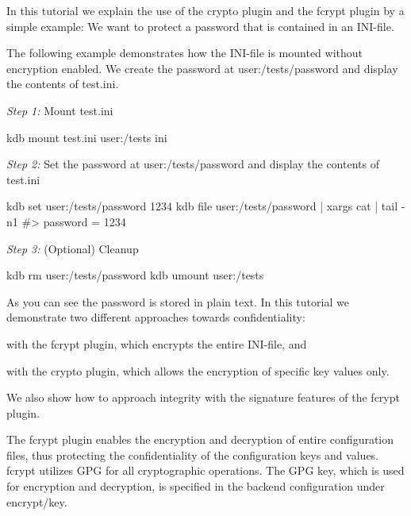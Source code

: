 In this tutorial we explain the use of the {\ttfamily crypto} plugin and the {\ttfamily fcrypt} plugin by a simple example\+: We want to protect a password that is contained in an I\+N\+I-\/file.

The following example demonstrates how the I\+N\+I-\/file is mounted without encryption enabled. We create the password at {\ttfamily user\+:/tests/password} and display the contents of {\ttfamily test.\+ini}.

{\itshape Step 1\+:} Mount {\ttfamily test.\+ini}


\begin{DoxyCode}
kdb mount test.ini user:/tests ini
\end{DoxyCode}


{\itshape Step 2\+:} Set the password at {\ttfamily user\+:/tests/password} and display the contents of {\ttfamily test.\+ini}


\begin{DoxyCode}
kdb set user:/tests/password 1234
kdb file user:/tests/password | xargs cat | tail -n1
#> password = 1234
\end{DoxyCode}


{\itshape Step 3\+:} (Optional) Cleanup


\begin{DoxyCode}
kdb rm user:/tests/password
kdb umount user:/tests
\end{DoxyCode}


As you can see the password is stored in plain text. In this tutorial we demonstrate two different approaches towards confidentiality\+:


\begin{DoxyEnumerate}
\item with the {\ttfamily fcrypt} plugin, which encrypts the entire I\+N\+I-\/file, and
\item with the {\ttfamily crypto} plugin, which allows the encryption of specific key values only.
\end{DoxyEnumerate}

We also show how to approach integrity with the signature features of the {\ttfamily fcrypt} plugin.

The {\ttfamily fcrypt} plugin enables the encryption and decryption of entire configuration files, thus protecting the confidentiality of the configuration keys and values. {\ttfamily fcrypt} utilizes G\+PG for all cryptographic operations. The G\+PG key, which is used for encryption and decryption, is specified in the backend configuration under {\ttfamily encrypt/key}.


